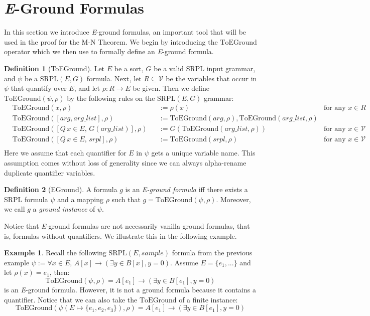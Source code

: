 \documentclass[12pt]{article}
\theoremstyle{definition}
\newtheorem{definition}{Definition}
\newtheorem{example}{Example}
\theoremstyle{remark}
\newcommand{\SRPL}{\text{SRPL}}
\newcommand{\toground}{\text{ToEGround}}
\begin{document}
\section{\textit{E}-Ground Formulas}

In this section we introduce \textit{E}-ground formulas, an important tool that will be used in the proof for the M-N Theorem.  We begin by introducing the $\toground$ operator which we then use to formally define an \textit{E}-ground formula.

\begin{definition}[ToEGround]
  Let $E$ be a sort, $G$ be a valid SRPL input grammar, and $\psi$ be a $\SRPL(E,G)$ formula.  Next, let $R \subseteq \mathcal{V}$ be the variables that occur in $\psi$ that quantify over $E$, and let $\rho : R \to E$ be given.  Then we define $\toground(\psi,\rho)$ by the following rules on the $\SRPL(E,G)$ grammar:
  \begin{align*}
    &\toground(x,\rho)& &:= \rho(x) \qquad &\text{for any } x \in R\\
    &\toground([arg,arg\_list],\rho)& &:= \toground(arg,\rho),\toground(arg\_list,\rho)\\
    &\toground([Q \, x \in E, \, G(arg\_list)],\rho)& &:= G(\toground(arg\_list,\rho)) \qquad &\text{for any } x \in \mathcal{V}\\
    &\toground([Q \, x \in E, \, srpl],\rho)& &:= \toground(srpl,\rho)  \qquad &\text{for any } x \in \mathcal{V}\\
  \end{align*}
  Here we assume that each quantifier for $E$ in $\psi$ gets a unique variable name.  This assumption comes without loss of generality since we can always alpha-rename duplicate quantifier variables.
\end{definition}

\begin{definition}[EGround]
  A formula $g$ is an \textit{E-ground formula} iff there exists a SRPL formula $\psi$ and a mapping $\rho$ such that $g = \toground(\psi,\rho)$.  Moreover, we call $g$ a \textit{ground instance} of $\psi$.
\end{definition}

Notice that \textit{E}-ground formulas are not necessarily vanilla ground formulas, that is, formulas without quantifiers.  We illustrate this in the following example.

\begin{example}
  Recall the following $\SRPL(E,sample)$ formula from the previous example $\psi := \forall x \in E, \, A[x] \rightarrow (\exists y \in B[x], y = 0)$.  Assume $E = \{e_1,...\}$ and let $\rho(x) = e_1$, then:
  $$\toground(\psi,\rho) = A[e_1] \rightarrow (\exists y \in B[e_1], y = 0)$$
  is an \textit{E}-ground formula.  However, it is not a ground formula because it contains a quantifier.  Notice that we can also take the $\toground$ of a finite instance:
  $$\toground(\psi(E \mapsto \{e_1,e_2,e_3\}),\rho) = A[e_1] \rightarrow (\exists y \in B[e_1], y = 0)$$
\end{example}
\end{document}
